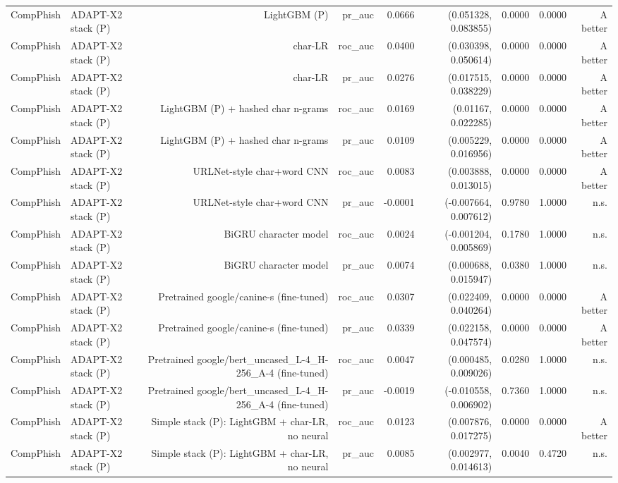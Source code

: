 \begin{table}[t]
\begin{tabular}{llrrrrrrr}
CompPhish & ADAPT-X2 stack (P) & LightGBM (P) & pr\_auc & 0.0666 & (0.051328, 0.083855) & 0.0000 & 0.0000 & A better \\
CompPhish & ADAPT-X2 stack (P) & char-LR & roc\_auc & 0.0400 & (0.030398, 0.050614) & 0.0000 & 0.0000 & A better \\
CompPhish & ADAPT-X2 stack (P) & char-LR & pr\_auc & 0.0276 & (0.017515, 0.038229) & 0.0000 & 0.0000 & A better \\
CompPhish & ADAPT-X2 stack (P) & LightGBM (P) + hashed char n-grams & roc\_auc & 0.0169 & (0.01167, 0.022285) & 0.0000 & 0.0000 & A better \\
CompPhish & ADAPT-X2 stack (P) & LightGBM (P) + hashed char n-grams & pr\_auc & 0.0109 & (0.005229, 0.016956) & 0.0000 & 0.0000 & A better \\
CompPhish & ADAPT-X2 stack (P) & URLNet-style char+word CNN & roc\_auc & 0.0083 & (0.003888, 0.013015) & 0.0000 & 0.0000 & A better \\
CompPhish & ADAPT-X2 stack (P) & URLNet-style char+word CNN & pr\_auc & -0.0001 & (-0.007664, 0.007612) & 0.9780 & 1.0000 & n.s. \\
CompPhish & ADAPT-X2 stack (P) & BiGRU character model & roc\_auc & 0.0024 & (-0.001204, 0.005869) & 0.1780 & 1.0000 & n.s. \\
CompPhish & ADAPT-X2 stack (P) & BiGRU character model & pr\_auc & 0.0074 & (0.000688, 0.015947) & 0.0380 & 1.0000 & n.s. \\
CompPhish & ADAPT-X2 stack (P) & Pretrained google/canine-s (fine-tuned) & roc\_auc & 0.0307 & (0.022409, 0.040264) & 0.0000 & 0.0000 & A better \\
CompPhish & ADAPT-X2 stack (P) & Pretrained google/canine-s (fine-tuned) & pr\_auc & 0.0339 & (0.022158, 0.047574) & 0.0000 & 0.0000 & A better \\
CompPhish & ADAPT-X2 stack (P) & Pretrained google/bert\_uncased\_L-4\_H-256\_A-4 (fine-tuned) & roc\_auc & 0.0047 & (0.000485, 0.009026) & 0.0280 & 1.0000 & n.s. \\
CompPhish & ADAPT-X2 stack (P) & Pretrained google/bert\_uncased\_L-4\_H-256\_A-4 (fine-tuned) & pr\_auc & -0.0019 & (-0.010558, 0.006902) & 0.7360 & 1.0000 & n.s. \\
CompPhish & ADAPT-X2 stack (P) & Simple stack (P): LightGBM + char-LR, no neural & roc\_auc & 0.0123 & (0.007876, 0.017275) & 0.0000 & 0.0000 & A better \\
CompPhish & ADAPT-X2 stack (P) & Simple stack (P): LightGBM + char-LR, no neural & pr\_auc & 0.0085 & (0.002977, 0.014613) & 0.0040 & 0.4720 & n.s. \\

\end{tabular}
\end{table}
